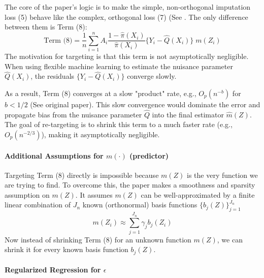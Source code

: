 \documentclass{article} %
\theoremstyle{plain} %
\theoremstyle{definition} %
\theoremstyle{remark} %
\begin{document}
The core of the paper's logic is to make the simple, non-orthogonal imputation loss (5) behave like the complex, orthogonal loss (7) (See \citet{Vansteelandt.2023}. The only difference between them is Term (8):
$$
\text{Term (8)} = \frac{1}{n}\sum_{i=1}^{n}A_{i}\frac{1-\hat{\pi}(X_{i})}{\hat{\pi}(X_{i})}\{Y_{i}-\hat{Q}(X_{i})\}\;m(Z_{i})
$$
The motivation for targeting is that this term is not asymptotically negligible. When using flexible machine learning to estimate the nuisance parameter $\hat{Q}(X_i)$, the residuals $\{Y_i - \hat{Q}(X_i)\}$ converge slowly.

As a result, Term (8) converges at a slow "product" rate, e.g., $O_p(n^{-b})$ for $b < 1/2$ (See original paper). This slow convergence would dominate the error and propagate bias from the nuisance parameter $\hat{Q}$ into the final estimator $\hat{m}(Z)$. The goal of re-targeting is to shrink this term to a much faster rate (e.g., $O_p(n^{-2/3})$), making it asymptotically negligible.

\paragraph{Additional Assumptions for $m(\cdot)$ (predictor)}

Targeting Term (8) directly is impossible because $m(Z)$ is the very function we are trying to find.
\newline
\newline
To overcome this, the paper makes a smoothness and sparsity assumption on $m(Z)$. It assumes $m(Z)$ can be well-approximated by a finite linear combination of $J_n$ known (orthonormal) basis functions $\{b_j(Z)\}_{j=1}^{J_n}$
$$
m(Z_i) \approx \sum_{j=1}^{J_n} \gamma_j b_j(Z_i)
$$
Now instead of shrinking Term (8) for an unknown function $m(Z)$, we can shrink it for every known basis function $b_j(Z)$. 

\paragraph{Regularized Regression for $\epsilon$}
\end{document}
